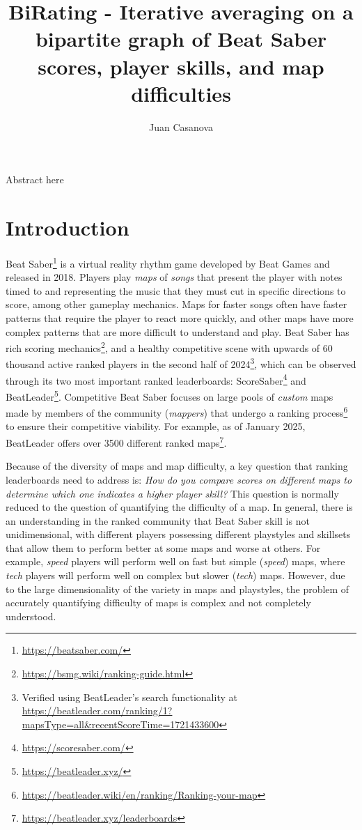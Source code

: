 \documentclass[12pt,a4paper]{article}
\title{BiRating - Iterative averaging on a bipartite graph of Beat Saber scores, player skills, and map difficulties}
\author{Juan Casanova}
\begin{document}
\maketitle

Abstract here

\tableofcontents

\section{Introduction}

Beat Saber\footnote{\url{https://beatsaber.com/}} is a virtual reality rhythm game developed by Beat Games and released in 2018. Players play {\emph{maps}} of {\emph{songs}} that present the player with notes timed to and representing the music that they must cut in specific directions to score, among other gameplay mechanics. Maps for faster songs often have faster patterns that require the player to react more quickly, and other maps have more complex patterns that are more difficult to understand and play. Beat Saber has rich scoring mechanics\footnote{\url{https://bsmg.wiki/ranking-guide.html}}, and a healthy competitive scene with upwards of 60 thousand active ranked players in the second half of 2024\footnote{Verified using BeatLeader's search functionality at \url{https://beatleader.com/ranking/1?mapsType=all&recentScoreTime=1721433600}}, which can be observed through its two most important ranked leaderboards: ScoreSaber\footnote{\url{https://scoresaber.com/}} and BeatLeader\footnote{\url{https://beatleader.xyz/}}. Competitive Beat Saber focuses on large pools of {\emph{custom}} maps made by members of the community ({\emph{mappers}}) that undergo a ranking process\footnote{\url{https://beatleader.wiki/en/ranking/Ranking-your-map}} to ensure their competitive viability. For example, as of January 2025, BeatLeader offers over 3500 different ranked maps\footnote{\url{https://beatleader.xyz/leaderboards}}.

Because of the diversity of maps and map difficulty, a key question that ranking leaderboards need to address is: {\emph{How do you compare scores on different maps to determine which one indicates a higher player skill?}} This question is normally reduced to the question of quantifying the difficulty of a map. In general, there is an understanding in the ranked community that Beat Saber skill is not unidimensional, with different players possessing different playstyles and skillsets that allow them to perform better at some maps and worse at others. For example, {\emph{speed}} players will perform well on fast but simple ({\emph{speed}}) maps, where {\emph{tech}} players will perform well on complex but slower ({\emph{tech}}) maps. However, due to the large dimensionality of the variety in maps and playstyles, the problem of accurately quantifying difficulty of maps is complex and not completely understood.\\
\end{document}
